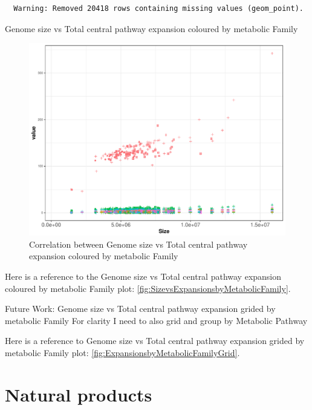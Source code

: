 \documentclass[12pt,twoside]{reedthesis}
\begin{document}
  \begin{verbatim}
  Warning: Removed 20418 rows containing missing values (geom_point).
  \end{verbatim}
  
  Genome size vs Total central pathway expansion coloured by metabolic
  Family
  
  \begin{figure}[h!tbp]
  \centering
  \includegraphics[angle = 0,scale = 0.6]{chapter2/Cyanobacteria/SizevsExpansionsbyMetabolicFamily.pdf}
  \caption[Correlation between Genome size vs Total central pathway expansion coloured by metabolic Family]{\normalsize{Correlation between Genome size vs Total central pathway expansion coloured by metabolic Family}}
  \label{fig:SizevsExpansionsbyMetabolicFamily}
  \end{figure}
  
  Here is a reference to the Genome size vs Total central pathway
  expansion coloured by metabolic Family plot:
  \autoref{fig:SizevsExpansionsbyMetabolicFamily}. \clearpage 
  
  Future Work: Genome size vs Total central pathway expansion grided by
  metabolic Family For clarity I need to also grid and group by Metabolic
  Pathway
  
  Here is a reference to Genome size vs Total central pathway expansion
  grided by metabolic Family plot:
  \autoref{fig:ExpansionsbyMetabolicFamilyGrid}. \clearpage 
  
  \section{Natural products}\label{natural-products-2}
  
\end{document}
